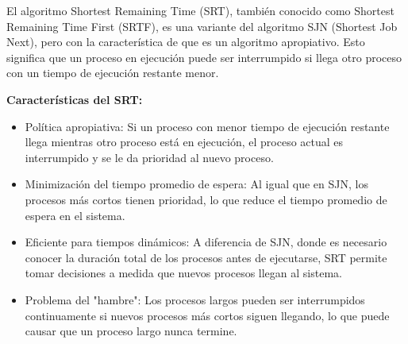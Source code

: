 El algoritmo Shortest Remaining Time (SRT), también conocido como Shortest Remaining Time First (SRTF), es una variante del algoritmo SJN (Shortest Job Next), pero con la característica de que es un algoritmo apropiativo. Esto significa que un proceso en ejecución puede ser interrumpido si llega otro proceso con un tiempo de ejecución restante menor.

\textbf{Características del SRT:} 
\begin{itemize} 
    \item Política apropiativa: Si un proceso con menor tiempo de ejecución restante llega mientras otro proceso está en ejecución, el proceso actual es interrumpido y se le da prioridad al nuevo proceso. 
    \item Minimización del tiempo promedio de espera: Al igual que en SJN, los procesos más cortos tienen prioridad, lo que reduce el tiempo promedio de espera en el sistema. 
    \item Eficiente para tiempos dinámicos: A diferencia de SJN, donde es necesario conocer la duración total de los procesos antes de ejecutarse, SRT permite tomar decisiones a medida que nuevos procesos llegan al sistema. 
    \item Problema del "hambre": Los procesos largos pueden ser interrumpidos continuamente si nuevos procesos más cortos siguen llegando, lo que puede causar que un proceso largo nunca termine. 
\end{itemize}